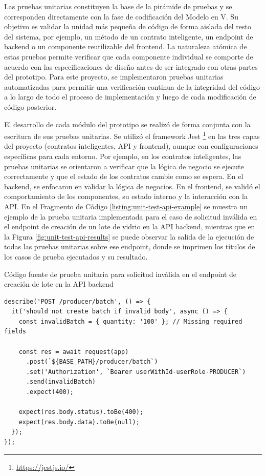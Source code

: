 Las pruebas unitarias constituyen la base de la pirámide de pruebas y se corresponden directamente con la fase de codificación del Modelo en V. Su objetivo es validar la unidad más pequeña de código de forma aislada del resto del sistema, por ejemplo, un método de un contrato inteligente, un \gls{endpoint} de backend o un componente reutilizable del frontend. La naturaleza atómica de estas pruebas permite verificar que cada componente individual se comporte de acuerdo con las especificaciones de diseño antes de ser integrado con otras partes del prototipo. Para este proyecto, se implementaron pruebas unitarias automatizadas para permitir una verificación continua de la integridad del código a lo largo de todo el proceso de implementación y luego de cada modificación de código posterior.

El desarrollo de cada módulo del prototipo se realizó de forma conjunta con la escritura de sus pruebas unitarias. Se utilizó el framework Jest \footnote{\url{https://jestjs.io/}} en las tres capas del proyecto (contratos inteligentes, API y \gls{frontend}), aunque con configuraciones específicas para cada entorno. Por ejemplo, en los contratos inteligentes, las pruebas unitarias se orientaron a verificar que la lógica de negocio se ejecute correctamente y que el estado de los contratos cambie como se espera. En el \gls{backend}, se enfocaron en validar la lógica de negocios. En el frontend, se validó el comportamiento de los componentes, su estado interno y la interacción con la API. En el Fragmento de Código \ref{listing:unit-test-api-example} se muestra un ejemplo de la prueba unitaria implementada para el caso de solicitud inválida en el endpoint de creación de un lote de vidrio en la API backend, mientras que en la Figura \ref{fig:unit-test-api-results} se puede observar la salida de la ejecución de todas las pruebas unitarias sobre ese endpoint, donde se imprimen los títulos de los casos de prueba ejecutados y su resultado.


\begin{listing}[!tp]
\caption{Código fuente de prueba unitaria para solicitud inválida en el endpoint de creación de lote en la API backend}
\label{listing:unit-test-api-example}
\begin{verbatim}
describe('POST /producer/batch', () => {
  it('should not create batch if invalid body', async () => {
    const invalidBatch = { quantity: '100' }; // Missing required fields

    const res = await request(app)
      .post(`${BASE_PATH}/producer/batch`)
      .set('Authorization', `Bearer userWithId-userRole-PRODUCER`)
      .send(invalidBatch)
      .expect(400);

    expect(res.body.status).toBe(400);
    expect(res.body.data).toBe(null);
  });
});
\end{verbatim}
\end{listing}

